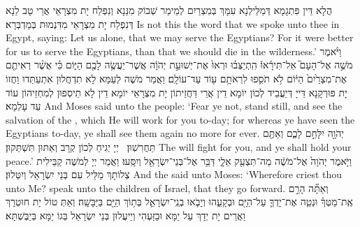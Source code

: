 {הֲלָא דֵּין פִּתְגָמָא דְּמַלֵּילְנָא עִמָּךְ בְּמִצְרַיִם לְמֵימַר שְׁבוֹק מִנַּנָא וְנִפְלַח יָת מִצְרָאֵי אֲרֵי טָב לַנָא דְּנִפְלַח יָת מִצְרָאֵי מִדִּנְמוּת בְּמַדְבְּרָא׃}
{Is not this the word that we spoke unto thee in Egypt, saying: Let us alone, that we may serve the Egyptians? For it were better for us to serve the Egyptians, than that we should die in the wilderness.’}{}
{וַיֹּ֨אמֶר מֹשֶׁ֣ה אֶל־הָעָם֮ אַל־תִּירָ֒אוּ֒ הִֽתְיַצְּב֗וּ וּרְאוּ֙ אֶת־יְשׁוּעַ֣ת יְהֹוָ֔ה אֲשֶׁר־יַעֲשֶׂ֥ה לָכֶ֖ם הַיּ֑וֹם כִּ֗י אֲשֶׁ֨ר רְאִיתֶ֤ם אֶת־מִצְרַ֙יִם֙ הַיּ֔וֹם לֹ֥א תֹסִ֛פוּ לִרְאֹתָ֥ם ע֖וֹד עַד־עוֹלָֽם׃
}
{וַאֲמַר מֹשֶׁה לְעַמָּא לָא תִדְחֲלוּן אִתְעַתַּדוּ וַחֲזוֹ יָת פּוּרְקָנָא דַּייָ דְּיַעֲבֵיד לְכוֹן יוֹמָא דֵין אֲרֵי דַּחֲזֵיתוֹן יָת מִצְרָאֵי יוֹמָא דֵין לָא תֵיסְפוּן לְמִחְזֵיהוֹן עוֹד עַד עָלְמָא׃}
{And Moses said unto the people: ‘Fear ye not, stand still, and see the salvation of the \lord, which He will work for you to-day; for whereas ye have seen the Egyptians to-day, ye shall see them again no more for ever.}{}
{יְהֹוָ֖ה יִלָּחֵ֣ם לָכֶ֑ם וְאַתֶּ֖ם תַּחֲרִשֽׁוּן׃ \petucha 
{}}
{יְיָ יְגִיחַ לְכוֹן קְרָב וְאַתּוּן תִּשְׁתְּקוּן׃}
{The \lord\space will fight for you, and ye shall hold your peace.’}{}
{וַיֹּ֤אמֶר יְהֹוָה֙ אֶל־מֹשֶׁ֔ה מַה־תִּצְעַ֖ק אֵלָ֑י דַּבֵּ֥ר אֶל־בְּנֵי־יִשְׂרָאֵ֖ל וְיִסָּֽעוּ׃
}
{וַאֲמַר יְיָ לְמֹשֶׁה קַבֵּילִית צְלוֹתָךְ מַלֵּיל עִם בְּנֵי יִשְׂרָאֵל וְיִטְּלוּן׃}
{And the \lord\space said unto Moses: ‘Wherefore criest thou unto Me? speak unto the children of Israel, that they go forward.}{}
{וְאַתָּ֞ה הָרֵ֣ם אֶֽת־מַטְּךָ֗ וּנְטֵ֧ה אֶת־יָדְךָ֛ עַל־הַיָּ֖ם וּבְקָעֵ֑הוּ וְיָבֹ֧אוּ בְנֵֽי־יִשְׂרָאֵ֛ל בְּת֥וֹךְ הַיָּ֖ם בַּיַּבָּשָֽׁה׃}
{וְאַתְּ טוֹל יָת חוּטְרָךְ וַאֲרֵים יָת יְדָךְ עַל יַמָּא וּבַזַּעְהִי וְיֵיעֲלוּן בְּנֵי יִשְׂרָאֵל בְּגוֹ יַמָּא בְּיַבֶּשְׁתָּא׃}
